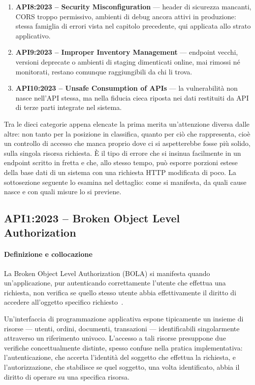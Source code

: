 \begin{enumerate}
  \item \textbf{API8:2023 -- Security Misconfiguration} — header di
    sicurezza mancanti, CORS troppo permissivo, ambienti di debug ancora
    attivi in produzione: stessa famiglia di errori vista nel capitolo
    precedente, qui applicata allo strato applicativo.

  \item \textbf{API9:2023 -- Improper Inventory Management} — endpoint
    vecchi, versioni deprecate o ambienti di staging dimenticati online, mai
    rimossi né monitorati, restano comunque raggiungibili da chi li trova.

  \item \textbf{API10:2023 -- Unsafe Consumption of APIs} — la vulnerabilità
    non nasce nell'API stessa, ma nella fiducia cieca riposta nei dati
    restituiti da API di terze parti integrate nel sistema.
\end{enumerate}

Tra le dieci categorie appena elencate la prima merita un'attenzione diversa
dalle altre: non tanto per la posizione in classifica, quanto per ciò che
rappresenta, cioè un controllo di accesso che manca proprio dove ci si
aspetterebbe fosse più solido, sulla singola risorsa richiesta. È il tipo di
errore che si insinua facilmente in un endpoint scritto in fretta e che, allo
stesso tempo, può esporre porzioni estese della base dati di un sistema con una
richiesta HTTP modificata di poco. La sottosezione seguente lo esamina nel
dettaglio: come si manifesta, da quali cause nasce e con quali misure lo si
previene.

\subsection{API1:2023 -- Broken Object Level Authorization}
\label{subsubsec:api1}

\paragraph{Definizione e collocazione}

La Broken Object Level Authorization (BOLA) si manifesta quando un'applicazione, pur autenticando
correttamente l'utente che effettua una richiesta, non verifica se quello stesso utente abbia
effettivamente il diritto di accedere all'oggetto specifico
richiesto~\cite{owasp2023api1}.

Un'interfaccia di programmazione applicativa espone tipicamente un insieme di risorse --- utenti,
ordini, documenti, transazioni --- identificabili singolarmente attraverso un riferimento univoco.
L'accesso a tali risorse presuppone due verifiche concettualmente distinte, spesso confuse nella
pratica implementativa: l'autenticazione, che accerta l'identità del soggetto che effettua la
richiesta, e l'autorizzazione, che stabilisce se quel soggetto, una volta identificato, abbia il
diritto di operare su una specifica risorsa.

